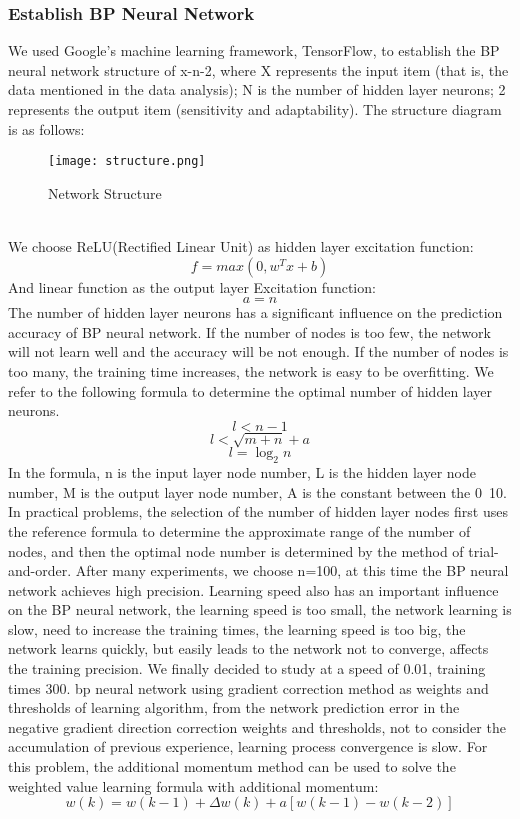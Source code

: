 \documentclass{mcmthesis}
\begin{document}
\subsubsection{Establish BP Neural Network}
We used Google's machine learning framework, TensorFlow, to establish the BP 
neural network structure of x-n-2, where X represents the input item (that is, 
the data mentioned in the data analysis); N is the number of hidden layer neurons; 2 
represents the output item (sensitivity and adaptability). The structure diagram is 
as follows:
\begin{figure}[h]
\small
\centering
\texttt{[image: structure.png]}
\caption{Network Structure} 
\label{fig:ns}
\end{figure}\\
We choose ReLU(Rectified Linear Unit) as hidden layer excitation function:
\[ f=max\left ( 0,w^{T}x+b \right ) \]
And linear function as the output layer Excitation function:
\[ a=n \]
The number of hidden layer neurons has a significant influence on 
the prediction accuracy of BP neural network. If the number of 
nodes is too few, the network will not learn well and the accuracy 
will be not enough. If the number of nodes is too many, the 
training time increases, the network is easy to be overfitting. 
We refer to the following formula to determine the optimal number 
of hidden layer neurons.
\[ l< n-1 \]
\[ l<\sqrt{m+n}+a \]
\[ l=\log_{2} n \]
In the formula, n is the input layer node number, L is the hidden 
layer node number, M is the output layer node number, A is the constant 
between the 0~10. In practical problems, the selection of the number 
of hidden layer nodes first uses the reference formula to determine 
the approximate range of the number of nodes, and then the optimal 
node number is determined by the method of trial-and-order. After 
many experiments, we choose n=100, at this time the BP neural network 
achieves high precision. Learning speed also has an important influence 
on the BP neural network, the learning speed is too small, the 
network learning is slow, need to increase the training times, the 
learning speed is too big, the network learns quickly, but easily 
leads to the network not to converge, affects the training precision. 
We finally decided to study at a speed of 0.01, training times 300. 
bp neural network using gradient correction method as weights and 
thresholds of learning algorithm, from the network prediction error 
in the negative gradient direction correction weights and thresholds, 
not to consider the accumulation of previous experience, learning 
process convergence is slow. For this problem, the additional momentum 
method can be used to solve the weighted value learning formula 
with additional momentum:
\[ w\left ( k \right )=
w\left ( k-1 \right )+\Delta w\left 
( k \right )+a\left [ w\left ( k-1 \right )-w\left 
( k-2 \right ) \right ] \]
\end{document}
